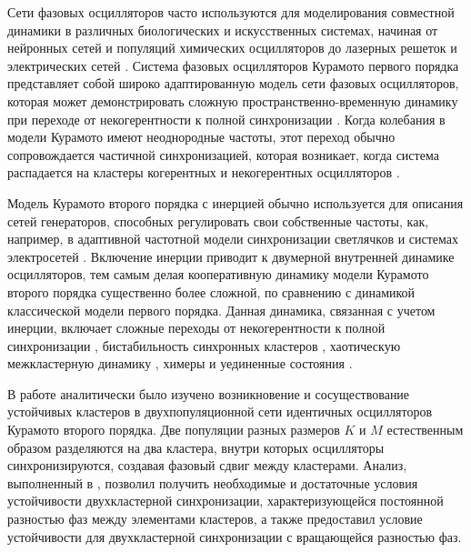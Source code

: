 Сети фазовых осцилляторов часто используются для моделирования
совместной динамики в различных биологических и
искусственных системах, начиная от нейронных сетей \cite{Hoppensteadt:Izhikevich} и
популяций химических осцилляторов \cite{Tinsley:Nkomo} до лазерных решеток \cite{Ding:Belykh}
и электрических сетей \cite{Dorfler:Chertkov}. Система
фазовых осцилляторов Курамото первого порядка \cite{Kuramoto,Strogatz} представляет собой широко адаптированную модель
сети фазовых осцилляторов, которая может демонстрировать сложную
пространственно-временную динамику при переходе от
некогерентности к полной синхронизации \cite{Acebron:Bonilla,Barreto:Hunt,Ott:Antonsen,Hong:Chate,Pikovsky:Rosenblum,Maistrenko:Popovych,Dorfler:Bullo,Martens:Barreto}.
Когда колебания в модели Курамото имеют неоднородные частоты, этот переход обычно
сопровождается частичной синхронизацией, которая возникает, когда система
распадается на кластеры когерентных и некогерентных осцилляторов
\cite{Acebron:Bonilla,Martens:Barreto,Laing}.

Модель Курамото второго порядка с инерцией обычно используется для описания сетей генераторов,
способных регулировать свои собственные частоты, как, например, в адаптивной частотной
модели синхронизации светлячков \cite{Ermentrout} и системах электросетей \cite{Tumash}.
Включение инерции приводит к двумерной внутренней динамике осцилляторов,
тем самым делая кооперативную динамику модели Курамото второго порядка существенно более
сложной, по сравнению с динамикой классической модели первого порядка.
Данная динамика, связанная с учетом инерции, включает сложные переходы от некогерентности
к полной синхронизации \cite{Tanaka:Review,Tanaka:Physica,Peron,Munyaev:Smirnov,Komarov:Gupta,Olmi:Navas,Barabash:Belykh},
бистабильность синхронных кластеров \cite{Belykh:Brister}, хаотическую межкластерную динамику \cite{Brister:Belykh},
химеры \cite{Olmi:Chaos, Maistrenko:Brezetsky, Medvedev:Mizuhara} и уединенные состояния \cite{Jaros:Maistrenko, Jaros:Brezetsky}.

В работе \cite{Belykh:Brister} аналитически было изучено возникновение и сосуществование устойчивых
кластеров в двухпопуляционной сети идентичных осцилляторов Курамото второго порядка.
Две популяции разных размеров $K$ и $M$ естественным образом разделяются на два кластера,
внутри которых осцилляторы синхронизируются, создавая фазовый сдвиг между кластерами.
Анализ, выполненный в \cite{Belykh:Brister}, позволил получить необходимые и достаточные условия устойчивости
двухкластерной синхронизации, характеризующейся постоянной разностью фаз между элементами кластеров, а
также предоставил условие устойчивости для двухкластерной синхронизации с
вращающейся разностью фаз.

